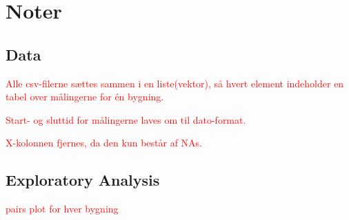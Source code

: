 \chapter{Noter}

\section{Data}
\textcolor{red}{Alle csv-filerne sættes sammen i en liste(vektor), så hvert element indeholder en tabel over målingerne for én bygning.}

\textcolor{red}{Start- og sluttid for målingerne laves om til dato-format.}

\textcolor{red}{X-kolonnen fjernes, da den kun består af NAs.}


\section{Exploratory Analysis}
\textcolor{red}{pairs plot for hver bygning}